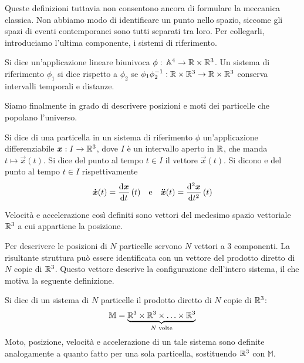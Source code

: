Queste definizioni tuttavia non consentono ancora di formulare la meccanica classica. Non abbiamo modo di identificare un punto nello spazio, siccome gli spazi di eventi contemporanei sono tutti separati tra loro. Per collegarli, introduciamo l'ultima componente, i sistemi di riferimento.
\begin{definition}
  Si dice  un'applicazione lineare biunivoca $\phi:\, \mathbb{A}^4 \to \mathbb{R}\times \mathbb{R}^3$. Un sistema di riferimento $\phi_1$ si dice  rispetto a $\phi_2$ se $\phi_1 \phi_2^{-1}: \mathbb{R}\times \mathbb{R}^3\to \mathbb{R}\times \mathbb{R}^3$ conserva intervalli temporali e distanze.
\end{definition}

Siamo finalmente in grado di descrivere posizioni e moti dei particelle che popolano l'universo.
\begin{definition}
  Si dice  di una particella in un sistema di riferimento $\phi$ un'applicazione differenziabile $\boldsymbol{x}:I \to \mathbb{R}^3$, dove $I$ è un intervallo aperto in $\mathbb{R}$, che manda $t\mapsto \vec{x}(t)$. Si dice  del punto al tempo $t \in I$ il vettore $\vec{x}(t)$. Si dicono  e  del punto al tempo $t \in I$ rispettivamente \begin{equation}
  \vec{\dot{x}} (t) = \dv{\vec{x}}{t}\, (t) \qqtext{e} \vec{\ddot{x}} (t) = \dv[2]{\vec{x}}{t}\, (t)
  \end{equation} 
\end{definition}
\begin{remark}
  Velocità e accelerazione così definiti sono vettori del medesimo spazio vettoriale $\mathbb{R}^3$ a cui appartiene la posizione.
\end{remark}

Per descrivere le posizioni di $N$ particelle servono $N$ vettori a 3 componenti. La risultante struttura può essere identificata con un vettore del prodotto diretto di $N$ copie di $\mathbb{R}^3$. Questo vettore descrive la configurazione dell'intero sistema, il che motiva la seguente definizione.
\begin{definition}
  Si dice  di un sistema di $N$ particelle il prodotto diretto di $N$ copie di $\mathbb{R}^3$: \begin{equation}
  \mathbb{M} = \underbrace{\mathbb{R}^3 \times \mathbb{R}^3 \times \ldots \times \mathbb{R}^3}_{N \text{ volte}}
  \end{equation} 
  Moto, posizione, velocità e accelerazione di un tale sistema sono definite analogamente a quanto fatto per una sola particella, sostituendo $\mathbb{R}^3$ con $\mathbb{M}$.
\end{definition}

